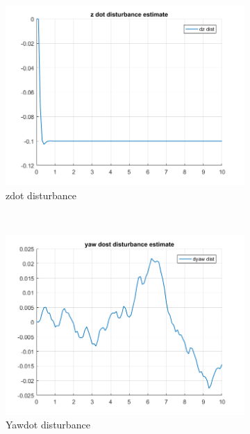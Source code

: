 \documentclass[11pt]{article}
\begin{document}
\begin{enumerate}
\begin{figure}[ht]
        \begin{subfigure}[c]{0.3\linewidth}
            \centering
            \includegraphics[width=\linewidth]{Plots_10_OffsetFreeTracking_Varying/08}
            \caption{zdot disturbance}
        \end{subfigure}
        ~
        \begin{subfigure}[c]{0.3\linewidth}
            \centering
            \includegraphics[width=\linewidth]{Plots_10_OffsetFreeTracking_Varying/09}
            \caption{Yawdot disturbance}
        \end{subfigure}
        ~
        \begin{subfigure}[c]{0.3\linewidth}
            \centering

\end{subfigure}
\end{figure}
\end{enumerate}
\end{document}
